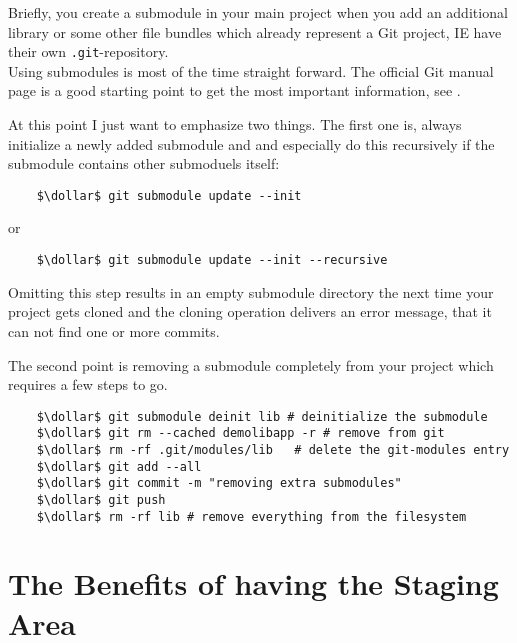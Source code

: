 Briefly, you create a submodule in your main project when you add an additional library or some other file 
bundles which already represent a Git project, \ac{IE} have their own \verb|.git|-repository.
\\
Using submodules is most of the time straight forward. The official Git manual page is a good starting point 
to get the most important information, see \cite{Unknown2021Git-Tools-Submodule}.

At this point I just want to emphasize two things. The first one is, always initialize a newly added submodule
and and especially do this recursively if the submodule contains other submoduels itself:
\begin{lstlisting}
	$\dollar$ git submodule update --init
\end{lstlisting}  
or
\begin{lstlisting}
	$\dollar$ git submodule update --init --recursive
\end{lstlisting}
Omitting this step results in an empty submodule directory the next time your project gets cloned and the 
cloning operation delivers an error message, that it can not find one or more commits.

The second point is removing a submodule completely from your project which requires a few steps to go.

\begin{lstlisting}
	$\dollar$ git submodule deinit lib # deinitialize the submodule
	$\dollar$ git rm --cached demolibapp -r # remove from git
	$\dollar$ rm -rf .git/modules/lib	# delete the git-modules entry
	$\dollar$ git add --all
	$\dollar$ git commit -m "removing extra submodules"
	$\dollar$ git push
	$\dollar$ rm -rf lib # remove everything from the filesystem	
\end{lstlisting}



\section{The Benefits of having the Staging Area}
\label{chapter:Miscellaneous.4}

